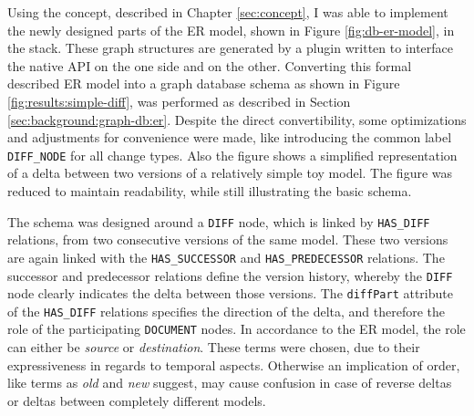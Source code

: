 \label{sec:results}

Using the concept, described in Chapter \ref{sec:concept}, I was able to implement the newly designed parts of the ER model, shown in Figure \ref{fig:db-er-model}, in the \masymos \neoj stack. These graph structures are generated by a plugin written to interface the native \neoj API on the one side and \bives on the other.
Converting this formal described ER model into a graph database schema as shown in Figure \ref{fig:results:simple-diff}, was performed as described in Section \ref{sec:background:graph-db:er}. Despite the direct convertibility, some optimizations and adjustments for convenience were made, like introducing the common label \texttt{DIFF\_NODE} for all change types.
Also the figure shows a simplified representation of a delta between two versions of a relatively simple toy model. The figure was reduced to maintain readability, while still illustrating the basic schema.

The schema was designed around a \texttt{DIFF} node, which is linked by \texttt{HAS\_DIFF} relations, from two consecutive versions of the same model. These two versions are again linked with the \texttt{HAS\_SUCCESSOR} and \texttt{HAS\_PREDECESSOR} relations.
The successor and predecessor relations define the version history, whereby the \texttt{DIFF} node clearly indicates the delta between those versions. The \texttt{diffPart} attribute of the \texttt{HAS\_DIFF} relations specifies the direction of the delta, and therefore the role of the participating \texttt{DOCUMENT} nodes. In accordance to the ER model, the role can either be \emph{source} or \emph{destination}.
These terms were chosen, due to their expressiveness in regards to temporal aspects. Otherwise an implication of order, like terms as \emph{old} and \emph{new} suggest, may cause confusion in case of reverse deltas or deltas between completely different models.

